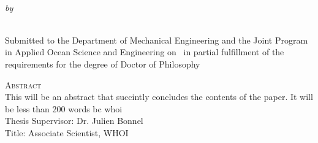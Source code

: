 \begin{center}
{\large \@title} \\
\emph{\footnotesize by} \\
\@author \\
\end{center}

\vspace{-1em}

\begin{center}
\begin{singlespace}
{\parindent0pt
\small
Submitted to the Department of Mechanical Engineering and the Joint Program in Applied Ocean Science and Engineering on \@date ~in partial fulfillment of the requirements for the degree of Doctor of Philosophy}
\end{singlespace}
\end{center}

\begin{singlespace}
{\parindent0pt 
	{\large \textsc{Abstract}} \\ %

    This will be an abstract that succintly concludes the contents of the paper. It will be less than 200 words bc whoi \\

	\noindent Thesis Supervisor: Dr. Julien Bonnel \\
	\noindent Title: Associate Scientist, WHOI \\
}
\end{singlespace}

\newpage
\null
\thispagestyle{empty}
\newpage